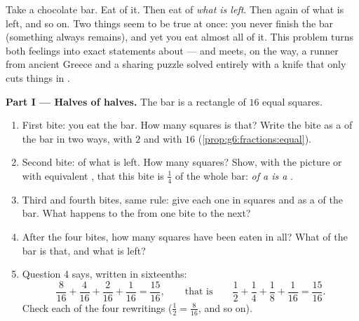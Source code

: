 \begin{problem}
\label{pb:g6:fractions:1}
Take a chocolate bar. Eat  of it. Then eat  of \emph{what
is left}. Then again  of what is left, and so on. Two things
seem to be true at once: you never finish the bar (something always
remains), and yet you eat almost all of it. This problem turns both
feelings into exact statements about  --- and meets, on
the way, a runner from ancient Greece and a sharing puzzle solved
entirely with a knife that only cuts things in .

\medskip
\noindent\textbf{Part I --- Halves of halves.}
The bar is a rectangle of $16$ equal squares.
\begin{enumerate}
  \item First bite: you eat  the bar. How many squares is
        that? Write the bite as a  of the bar in two ways,
        with  $2$ and with  $16$
        (\cref{prop:g6:fractions:equal}).
  \item Second bite:  of what is left. How many squares? Show,
        with the picture or with equivalent , that this
        bite is $\frac14$ of the whole bar: \emph{ of a 
        is a }.
  \item Third and fourth bites, same rule: give each one in
        squares and as a  of the bar. What happens to the
         from one bite to the next?
  \item After the four bites, how many squares have been eaten in
        all? What  of the bar is that, and what 
        is left?
  \item Question 4 says, written in sixteenths:
        \[
        \frac{8}{16} + \frac{4}{16} + \frac{2}{16} + \frac{1}{16}
        = \frac{15}{16},
        \qquad\text{that is}\qquad
        \frac12 + \frac14 + \frac18 + \frac{1}{16}
        = \frac{15}{16} .
        \]
        Check each of the four rewritings
        ($\frac12 = \frac{8}{16}$, and so on).
\end{enumerate}


\end{problem}
